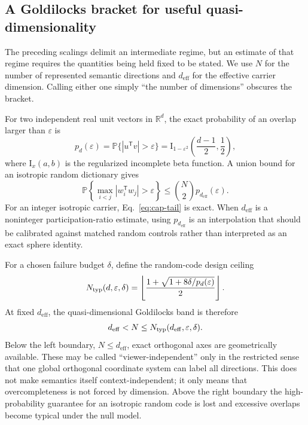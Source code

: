 \documentclass[
  aps,
  reprint,
  superscriptaddress,
  floatfix,
  nofootinbib,
  longbibliography
]{revtex4-2}
\newcommand{\R}{\mathbb{R}}
\newcommand{\Prob}{\mathbb{P}}
\newcommand{\deff}{d_{\mathrm{eff}}}
\newcommand{\T}{^{\mathsf{T}}}
\begin{document}
\subsection{A Goldilocks bracket for useful quasi-dimensionality}
\label{sec:goldilocks}

The preceding scalings delimit an intermediate regime, but an estimate of
that regime requires the quantities being held fixed to be stated.  We use
$N$ for the number of represented semantic directions and $\deff$ for the
effective carrier dimension.  Calling either one simply ``the number of
dimensions'' obscures the bracket.

For two independent real unit vectors in $\R^d$, the exact probability of an
overlap larger than $\varepsilon$ is
%
\begin{equation}
\label{eq:cap-tail}
p_d(\varepsilon)
=\Prob\{|u\T v|>\varepsilon\}
=\mathrm I_{1-\varepsilon^2}
 \!\left(\frac{d-1}{2},\frac12\right),
\end{equation}
%
where $\mathrm I_x(a,b)$ is the regularized incomplete beta function.  A
union bound for an isotropic random dictionary gives
%
\begin{equation}
\label{eq:gold-failure}
\Prob\!\left\{\max_{i<j}|w_i\T w_j|>\varepsilon\right\}
\leq {N\choose2}p_{\deff}(\varepsilon).
\end{equation}
%
For an integer isotropic carrier, Eq.~\eqref{eq:cap-tail} is exact.  When
$\deff$ is a noninteger participation-ratio estimate, using
$p_{\deff}$ is an interpolation that should be calibrated against matched
random controls rather than interpreted as an exact sphere identity.

For a chosen failure budget $\delta$, define the random-code design ceiling
%
\begin{equation}
\label{eq:ntyp}
N_{\rm typ}(d,\varepsilon,\delta)
=\left\lfloor
\frac{1+\sqrt{1+8\delta/p_d(\varepsilon)}}{2}
\right\rfloor .
\end{equation}
%
At fixed $\deff$, the quasi-dimensional Goldilocks band is therefore
%
\begin{equation}
\label{eq:gold-fixed-d}
\deff<N\leq N_{\rm typ}(\deff,\varepsilon,\delta).
\end{equation}
%
Below the left boundary, $N\leq\deff$, exact orthogonal axes are
geometrically available.  These may be called ``viewer-independent'' only in
the restricted sense that one global orthogonal coordinate system can label
all directions.  This does not make semantics itself context-independent; it
only means that overcompleteness is not forced by dimension.  Above the
right boundary the high-probability guarantee for an isotropic random code is
lost and excessive overlaps become typical under the null model.
\end{document}
